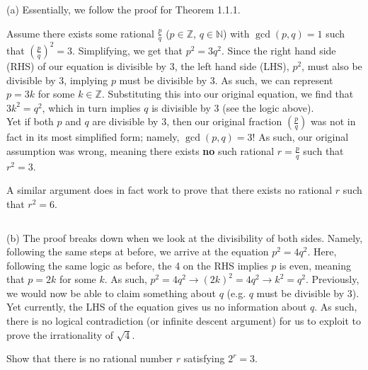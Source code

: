 \documentclass[../analysis_notes.tex]{subfiles}
\begin{document}
\begin{solution}
    (a) Essentially, we follow the proof for Theorem 1.1.1. 

    Assume there exists some rational \( \frac{p}{q} \) ($p \in \mathbb{Z}$, $q \in \mathbb{N}$) with $\gcd(p, q) = 1$ such that $\left(\frac{p}{q}\right)^2 = 3$. Simplifying, we get that $p^2 = 3q^2$. Since the right hand side (RHS) of our equation is divisible by 3, the left hand side (LHS), $p^2$, must also be divisible by 3, implying $p$ must be divisible by 3. As such, we can represent $p = 3k$ for some $k \in \mathbb{Z}$. Substituting this into our original equation, we find that $3k^2 = q^2$, which in turn implies $q$ is divisible by 3 (see the logic above). \\
    Yet if both $p$ and $q$ are divisible by 3, then our original fraction $\left(\frac{p}{q}\right)$ was not in fact in its most simplified form; namely, $\gcd(p, q) = 3$! As such, our original assumption was wrong, meaning there exists \textbf{no} such rational $r = \frac{p}{q}$ such that $r^2 = 3$.
    
    A similar argument does in fact work to prove that there exists no rational $r$ such that $r^2 = 6$.

    \[\] %

    (b) The proof breaks down when we look at the divisibility of both sides. Namely, following the same steps at before, we arrive at the equation $p^2 = 4q^2$. Here, following the same logic as before, the 4 on the RHS implies $p$ is even, meaning that $p = 2k$ for some $k$. As such, $p^2 = 4q^2 \rightarrow (2k)^2 = 4q^2 \rightarrow k^2 = q^2$. Previously, we would now be able to claim something about $q$ (e.g. $q$ must be divisible by 3). Yet currently, the LHS of the equation gives us no information about $q$. As such, there is no logical contradiction (or infinite descent argument) for us to exploit to prove the irrationality of $\sqrt{4}$.
\end{solution}


\begin{exercise}
    Show that there is no rational number \( r \) satisfying \( 2^{r} = 3 \).
\end{exercise}
\end{document}
